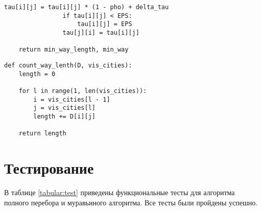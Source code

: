 \begin{lstlisting}[caption=Реализация муравьиного алгоритма, 
    label={ant}]
                tau[i][j] = tau[i][j] * (1 - pho) + delta_tau
                if tau[i][j] < EPS:
                    tau[i][j] = EPS
                tau[j][i] = tau[i][j]
                
    return min_way_length, min_way
\end{lstlisting}

\begin{lstlisting}[caption=Реализация алгоритма подсчета длины пути, 
    label={len}]
def count_way_lenth(D, vis_cities):
    length = 0

    for l in range(1, len(vis_cities)):
        i = vis_cities[l - 1]
        j = vis_cities[l]
        length += D[i][j]

    return length
\end{lstlisting}


\section{Тестирование}

В таблице \ref{tabular:test} приведены функциональные тесты для алгоритма полного перебора и муравьиного алгоритма. Все тесты были пройдены успешно.

